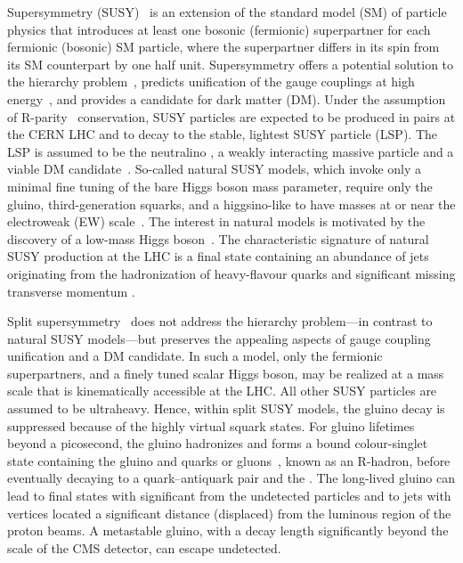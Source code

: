 Supersymmetry (SUSY)~\cite{ref:SUSY-1, ref:SUSY0, ref:SUSY3,
  ref:SUSY1} is an extension of the standard model (SM) of particle
physics that introduces at least one bosonic (fermionic) superpartner
for each fermionic (bosonic) SM particle, where the superpartner
differs in its spin from its SM counterpart by one half unit.
Supersymmetry offers a potential solution to the hierarchy
problem~\cite{ref:hierarchy1, ref:hierarchy2}, predicts unification of
the gauge couplings at high energy~\cite{Dimopoulos:1981yj,
  Ibanez:1981yh, Marciano:1981un}, and provides a candidate for dark
matter (DM). Under the assumption of R-parity~\cite{Farrar:1978xj}
conservation, SUSY particles are expected to be produced in pairs at
the CERN LHC and to decay to the stable, lightest SUSY particle
(LSP). The LSP is assumed to be the neutralino \PSGczDo, a weakly
interacting massive particle and a viable DM
candidate~\cite{Jungman:1995df, Patrignani:2016xqp}.  So-called
natural SUSY models, which invoke only a minimal fine tuning of the
bare Higgs boson mass parameter, require only the gluino,
third-generation squarks, and a higgsino-like \PSGczDo to have masses
at or near the electroweak (EW) scale~\cite{ref:barbierinsusy}. The
interest in natural models is motivated by the discovery of a low-mass
Higgs boson~\cite{Aad:2012tfa, Chatrchyan:2012ufa, Chatrchyan:2013lba,
  Khachatryan:2014jba, Aad:2014aba, Aad:2015zhl}. The characteristic
signature of natural SUSY production at the LHC is a final state
containing an abundance of jets originating from the hadronization of
heavy-flavour quarks and significant missing transverse momentum
\ptvecmiss.

Split supersymmetry~\cite{ArkaniHamed:2004fb, Giudice:2004tc} does not
address the hierarchy problem---in contrast to natural SUSY
models---but preserves the appealing aspects of gauge coupling
unification and a DM candidate. In such a model, only the fermionic
superpartners, and a finely tuned scalar Higgs boson, may be realized
at a mass scale that is kinematically accessible at the LHC. All other
SUSY particles are assumed to be ultraheavy. Hence, within split SUSY
models, the gluino decay is suppressed because of the highly virtual
squark states. For gluino lifetimes beyond a picosecond, the gluino
hadronizes and forms a bound colour-singlet state containing the
gluino and quarks or gluons~\cite{Fairbairn:2006gg}, known as an
R-hadron, before eventually decaying to a quark--antiquark pair and
the \PSGczDo. The long-lived gluino can lead to final states with
significant \ptvecmiss from the undetected \PSGczDo particles and to
jets with vertices located a significant distance (\ie displaced) from
the luminous region of the proton beams. A metastable gluino, with a
decay length significantly beyond the scale of the CMS detector, can
escape undetected.

